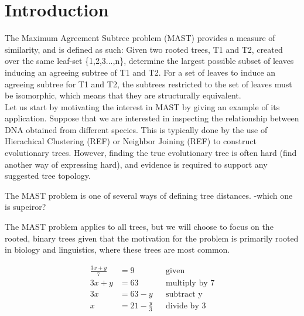 \chapter{Introduction}
\label{ch:intro}
The Maximum Agreement Subtree problem (MAST) provides a  measure of similarity, and is defined as such: Given two rooted trees, T1 and T2, created over the same leaf-set \{1,2,3...,n\}, determine the largest possible subset of leaves inducing an agreeing subtree of T1 and T2. For a set of leaves to induce an agreeing subtree for T1 and T2, the subtrees restricted to the set of leaves must be isomorphic, which means that they are structurally equivalent.
\\

Let us start by motivating the interest in MAST by giving an example of its application. Suppose that we are interested in inspecting the relationship between DNA obtained from different species. This is typically done by the use of  Hierachical Clustering (REF) or Neighbor Joining (REF) to construct evolutionary trees. However, finding the true evolutionary tree is often hard (find another way of expressing hard), and evidence is required to support any suggested tree topology.  




The MAST problem is one of several ways of defining tree distances. -which one is supeiror?



The MAST problem applies to all trees, but we will choose to focus on the rooted, binary trees given that the motivation for the problem is primarily rooted in biology and linguistics, where these trees are most common.  


\begin{align*}
	\frac{3x + y}{7} &= 9  && \text{given}   \\
	3x + y &= 63           && \text{multiply by 7}   \\
	3x &= 63 - y           && \text{subtract y}   \\
	x &= 21 - \frac{y}{3}  && \text{divide by 3}   \\
\end{align*}


